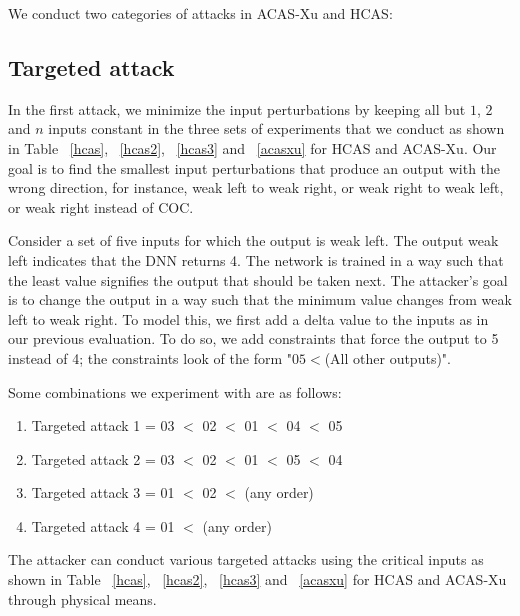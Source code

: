We conduct two categories of attacks in \ac{ACAS-Xu} and \ac{HCAS}:
\subsection{Targeted attack} 
In the first attack, we minimize the input perturbations by keeping all but $1$, $2$ and $n$ inputs constant in the three sets of experiments that we conduct as shown in Table ~\ref{hcas}, ~\ref{hcas2}, ~\ref{hcas3} and ~\ref{acasxu} for \ac{HCAS} and \ac{ACAS-Xu}. 
Our goal is to find the smallest input perturbations that produce an output with the wrong direction, for instance, weak left to weak right, or weak right to weak left, or weak right instead of COC. 


Consider a set of five inputs for which the output is weak left. 
The output weak left indicates that the \ac{DNN} returns 4. 
The network is trained in a way such that the least value signifies the output that should be taken next. 
The attacker's goal is to change the output in a way such that the minimum value changes from weak left to weak right. 
To model this, we first add a delta value to the inputs as in our previous evaluation. 
To do so, we add constraints that force the output to 5 instead of 4; the constraints look of the form "$05 < $(All other outputs)".


Some combinations we experiment with are as follows:
\begin{enumerate}
	\item Targeted attack 1 = 03 $<$ 02 $<$ 01 $<$ 04 $<$ 05
	\item Targeted attack 2 = 03 $<$ 02 $<$ 01 $<$ 05 $<$ 04
	\item Targeted attack 3 = 01 $<$ 02 $<$ (any order)
	\item Targeted attack 4 = 01 $<$ (any order) 
\end{enumerate}
 
The attacker can conduct various targeted attacks using the critical inputs as shown in Table ~\ref{hcas}, ~\ref{hcas2}, ~\ref{hcas3} and ~\ref{acasxu} for \ac{HCAS} and \ac{ACAS-Xu} through physical means. 



